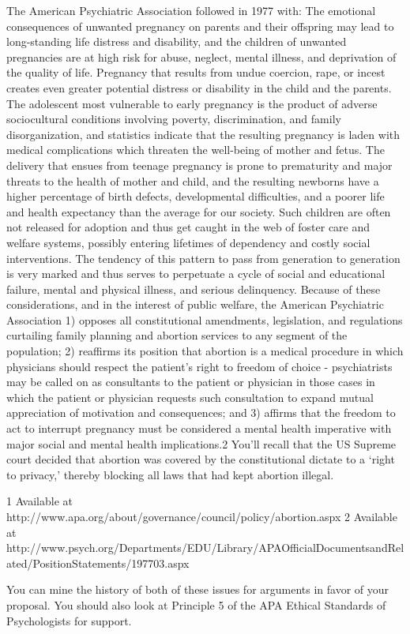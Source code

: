 {The American Psychiatric Association followed in 1977 with:
The emotional consequences of unwanted pregnancy on parents and their offspring may lead to long-standing life distress and disability, and the children of unwanted pregnancies are at high risk for abuse, neglect, mental illness, and deprivation of the quality of life. Pregnancy that results from undue coercion, rape, or incest creates even greater potential distress or disability in the child and the parents. The adolescent most vulnerable to early pregnancy is the product of adverse sociocultural conditions involving poverty, discrimination, and family disorganization, and statistics indicate that the resulting pregnancy is laden with medical complications which threaten the well-being of mother and fetus. The delivery that ensues from teenage pregnancy is prone to prematurity and major threats to the health of mother and child, and the resulting newborns have a higher percentage of birth defects, developmental difficulties, and a poorer life and health expectancy than the average for our society. Such children are often not released for adoption and thus get caught in the web of foster care and welfare systems, possibly entering lifetimes of dependency and costly social interventions. The tendency of this pattern to pass from generation to generation is very marked and thus serves to perpetuate a cycle of social and educational failure, mental and physical illness, and serious delinquency.
Because of these considerations, and in the interest of public welfare, the American Psychiatric Association
1) opposes all constitutional amendments, legislation, and regulations curtailing family planning and abortion services to any segment of the population; 2) reaffirms its position that abortion is a medical procedure in which physicians should respect the patient's right to freedom of choice - psychiatrists may be called on as consultants to the patient or physician in those cases in which the patient or physician requests such consultation to expand mutual appreciation of motivation and consequences; and 3) affirms that the freedom to act to interrupt pregnancy must be considered a mental health imperative with major social and mental health implications.⁠2
You'll recall that the US Supreme court decided that abortion was covered by the constitutional dictate to a `right to privacy,' thereby blocking all laws that had kept abortion illegal.

1 Available at http:\slash \slash www.apa.org\slash about\slash governance\slash council\slash policy\slash abortion.aspx
2 Available at http:\slash \slash www.psych.org\slash Departments\slash EDU\slash Library\slash APAOfficialDocumentsandRelated\slash PositionStatements\slash 197703.aspx} You can mine the history of both of these issues for arguments in favor of your proposal. You should also look at Principle 5 of the APA Ethical Standards of Psychologists for support.

